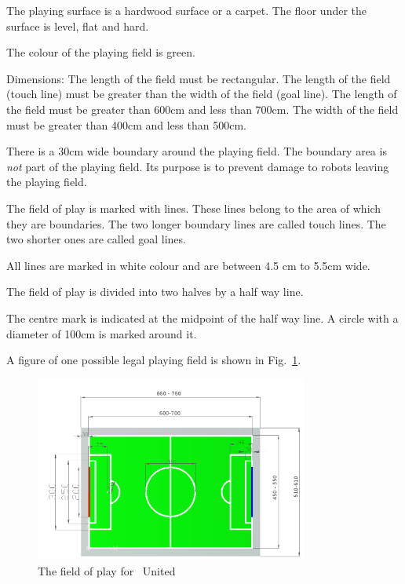 \documentclass[12pt]{hurocup}
\begin{document}
\begin{lawlist}[US]
  
\item The playing surface is a hardwood surface or a carpet. The floor
  under the surface is level, flat and hard.

\item The colour of the playing field is green.
  
\item Dimensions: The length of the field must be rectangular. The
  length of the field (touch line) must be greater than the width of
  the field (goal line). The length of the field must be greater than
  600cm and less than 700cm. The width of the field must be greater
  than 400cm and less than 500cm.
 
\item There is a 30cm wide boundary around the playing field. The
  boundary area is \emph{not} part of the playing field. Its purpose
  is to prevent damage to robots leaving the playing field.
 
\item The field of play is marked with lines. These lines belong to
  the area of which they are boundaries. The two longer boundary lines
  are called touch lines. The two shorter ones are called goal lines.

\item All lines are marked in white colour and are between 4.5 cm to
  5.5cm wide.

\item The field of play is divided into two halves by a half way
  line. 

\item The centre mark is indicated at the midpoint of the half way
  line. A circle with a diameter of 100cm is marked around it.
  
\item A figure of one possible legal playing field is shown in
  Fig.~\ref{fig:field-hurocup}.
  
  \begin{figure}
    \begin{center}
      \includegraphics[width=0.8\textwidth]{Figures/hurocup-field}
      \caption{The field of play for \HuroCup\ United}
      \label{fig:field-hurocup}
    \end{center}
  \end{figure}
  

\end{lawlist}
\end{document}
